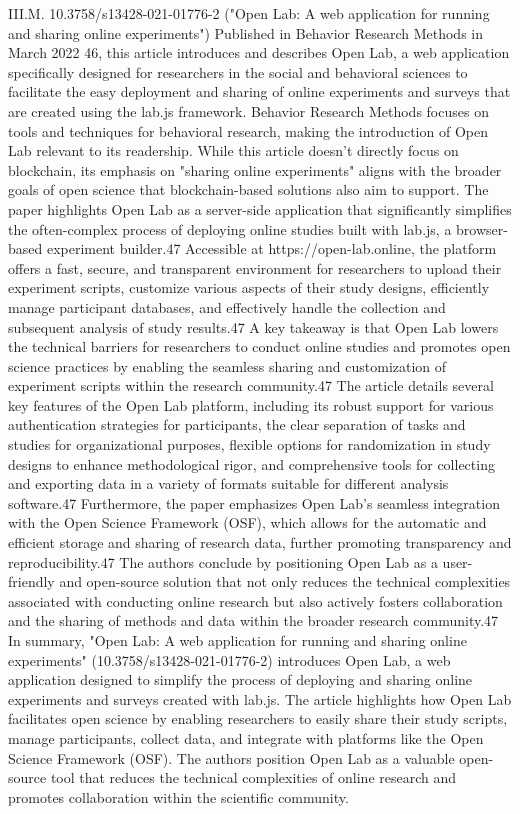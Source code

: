 \documentclass{article}
\begin{document}
III.M. 10.3758/s13428-021-01776-2 ("Open Lab: A web application for running and sharing online experiments")
Published in Behavior Research Methods in March 2022 46, this article introduces and describes Open Lab, a web application specifically designed for researchers in the social and behavioral sciences to facilitate the easy deployment and sharing of online experiments and surveys that are created using the lab.js framework. Behavior Research Methods focuses on tools and techniques for behavioral research, making the introduction of Open Lab relevant to its readership. While this article doesn't directly focus on blockchain, its emphasis on "sharing online experiments" aligns with the broader goals of open science that blockchain-based solutions also aim to support. The paper highlights Open Lab as a server-side application that significantly simplifies the often-complex process of deploying online studies built with lab.js, a browser-based experiment builder.47 Accessible at https://open-lab.online, the platform offers a fast, secure, and transparent environment for researchers to upload their experiment scripts, customize various aspects of their study designs, efficiently manage participant databases, and effectively handle the collection and subsequent analysis of study results.47 A key takeaway is that Open Lab lowers the technical barriers for researchers to conduct online studies and promotes open science practices by enabling the seamless sharing and customization of experiment scripts within the research community.47 The article details several key features of the Open Lab platform, including its robust support for various authentication strategies for participants, the clear separation of tasks and studies for organizational purposes, flexible options for randomization in study designs to enhance methodological rigor, and comprehensive tools for collecting and exporting data in a variety of formats suitable for different analysis software.47 Furthermore, the paper emphasizes Open Lab's seamless integration with the Open Science Framework (OSF), which allows for the automatic and efficient storage and sharing of research data, further promoting transparency and reproducibility.47 The authors conclude by positioning Open Lab as a user-friendly and open-source solution that not only reduces the technical complexities associated with conducting online research but also actively fosters collaboration and the sharing of methods and data within the broader research community.47
In summary, "Open Lab: A web application for running and sharing online experiments" (10.3758/s13428-021-01776-2) introduces Open Lab, a web application designed to simplify the process of deploying and sharing online experiments and surveys created with lab.js. The article highlights how Open Lab facilitates open science by enabling researchers to easily share their study scripts, manage participants, collect data, and integrate with platforms like the Open Science Framework (OSF). The authors position Open Lab as a valuable open-source tool that reduces the technical complexities of online research and promotes collaboration within the scientific community.
\end{document}
